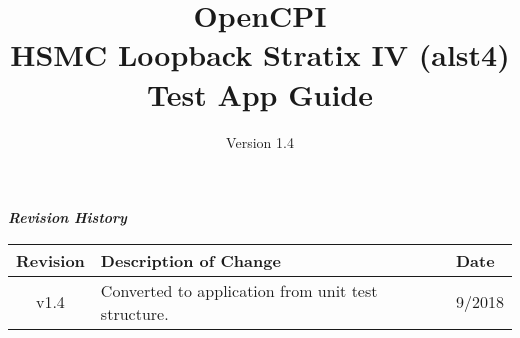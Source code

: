 \iffalse
This file is protected by Copyright. Please refer to the COPYRIGHT file
distributed with this source distribution.

This file is part of OpenCPI <http://www.opencpi.org>

OpenCPI is free software: you can redistribute it and/or modify it under the
terms of the GNU Lesser General Public License as published by the Free Software
Foundation, either version 3 of the License, or (at your option) any later
version.

OpenCPI is distributed in the hope that it will be useful, but WITHOUT ANY
WARRANTY; without even the implied warranty of MERCHANTABILITY or FITNESS FOR A
PARTICULAR PURPOSE. See the GNU Lesser General Public License for more details.

You should have received a copy of the GNU Lesser General Public License along
with this program. If not, see <http://www.gnu.org/licenses/>.
\fi

\def\docTitle{OpenCPI\\ HSMC Loopback Stratix IV (alst4) Test App Guide}
\def\docVersion{1.4}

\date{Version \docVersion} %
\title{\docTitle}
\usepackage{graphicx}
\graphicspath{ {figures/} }
\usepackage{textcomp}
\usepackage{listings}


\maketitle
	\begin{center}
	\textit{\textbf{Revision History}}
		\begin{table}[H]
		\label{table:revisions} %
			\begin{tabularx}{\textwidth}{|c|X|l|}
			\hline
			\rowcolor{blue}
			\textbf{Revision} & \textbf{Description of Change} & \textbf{Date} \\
		    \hline
		    v1.4 & Converted to application from unit test structure. & 9/2018 \\
			\hline
			\end{tabularx}
		\end{table}
	\end{center}

